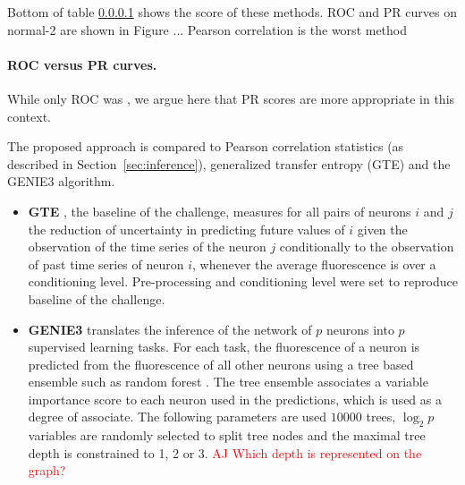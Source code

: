 \documentclass[wcp]{jmlr}
\begin{document}
Bottom of table \ref{} shows the score of these methods. ROC and PR
curves on normal-2 are shown in Figure ... Pearson correlation is the worst method

\paragraph{ROC versus PR curves.} While only ROC was , we argue here that PR scores are more appropriate in this context.




The proposed approach is compared to Pearson correlation statistics
(as described in Section~\ref{sec:inference}), generalized transfer
entropy (GTE) and the GENIE3 algorithm.
\begin{itemize}
\item \textbf{GTE} \citep{stetter2012model}, the baseline of the challenge,
measures for all pairs of neurons $i$ and $j$ the reduction of uncertainty in
predicting future values of $i$ given the observation of the time series of the
neuron $j$ conditionally to the observation of past time series of neuron $i$,
whenever the average fluorescence is over a conditioning level. Pre-processing
and conditioning level were set to reproduce baseline of the challenge.

\item \textbf{GENIE3} \citep{huynhthu2010inferring} translates the inference
of the network of $p$ neurons into $p$ supervised learning tasks. For each
task, the fluorescence of a neuron is predicted from the fluorescence of all
other neurons using a tree based ensemble such as random forest
\citep{breiman2001random}. The tree ensemble associates a variable importance
score \citep{louppe2013understanding} to each neuron used in the predictions,
which is used as a degree of associate. The following parameters are used
$10000$ trees, $\log_2{p}$ variables are randomly selected to split tree nodes
and the maximal tree depth is constrained to 1, 2 or 3. \textcolor{red}{AJ Which
depth is represented on the graph?}
\end{itemize}
\end{document}
